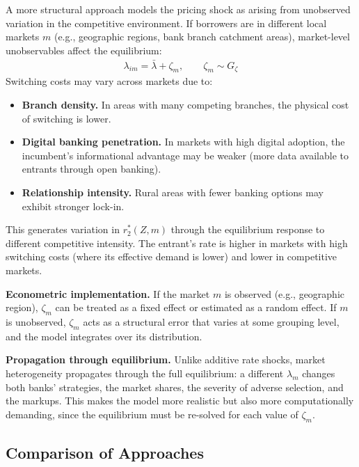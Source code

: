\documentclass[12pt]{article}
\theoremstyle{plain}
\theoremstyle{plain}
\theoremstyle{definition}  %
\theoremstyle{remark}  %
\begin{document}
A more structural approach models the pricing shock as arising from unobserved variation in the competitive environment. If borrowers are in different local markets $m$ (e.g., geographic regions, bank branch catchment areas), market-level unobservables affect the equilibrium:
\begin{align}\label{eq:market_het}
    \lambda_{im} = \bar{\lambda} + \zeta_m, \qquad \zeta_m \sim G_\zeta
\end{align}
Switching costs may vary across markets due to:
\begin{itemize}
    \item \textbf{Branch density.} In areas with many competing branches, the physical cost of switching is lower.
    \item \textbf{Digital banking penetration.} In markets with high digital adoption, the incumbent's informational advantage may be weaker (more data available to entrants through open banking).
    \item \textbf{Relationship intensity.} Rural areas with fewer banking options may exhibit stronger lock-in.
\end{itemize}

\noindent
This generates variation in $r_2^*(Z, m)$ through the equilibrium response to different competitive intensity. The entrant's rate is higher in markets with high switching costs (where its effective demand is lower) and lower in competitive markets.

\medskip\noindent
\textbf{Econometric implementation.} If the market $m$ is observed (e.g., geographic region), $\zeta_m$ can be treated as a fixed effect or estimated as a random effect. If $m$ is unobserved, $\zeta_m$ acts as a structural error that varies at some grouping level, and the model integrates over its distribution.

\medskip\noindent
\textbf{Propagation through equilibrium.} Unlike additive rate shocks, market heterogeneity propagates through the full equilibrium: a different $\lambda_m$ changes both banks' strategies, the market shares, the severity of adverse selection, and the markups. This makes the model more realistic but also more computationally demanding, since the equilibrium must be re-solved for each value of $\zeta_m$.

\subsection{Comparison of Approaches}
\end{document}
